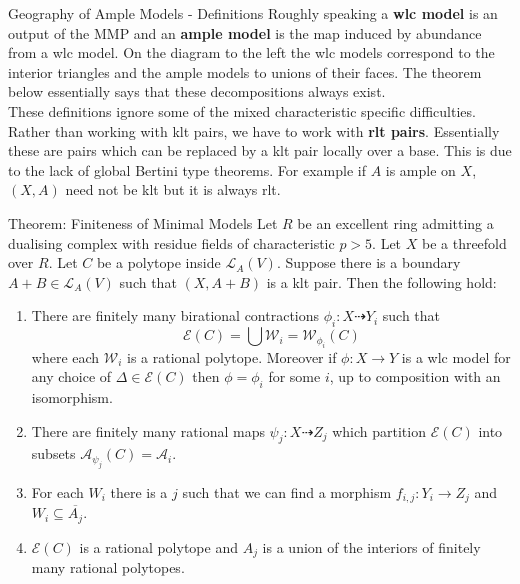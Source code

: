 \documentclass[final]{beamer}
\begin{document}
\begin{frame}[t, fragile]
\begin{columns}[t]
\begin{column}{0.44\paperwidth}
\begin{block}{Geography of Ample Models - Definitions}
				Roughly speaking a \textbf{wlc model} is an output of the MMP and an \textbf{ample model} is the map induced by abundance from a wlc model. On the diagram to the left the wlc models correspond to the interior triangles and the ample models to unions of their faces. The theorem below essentially says that these decompositions always exist.\\
				\hfill \break
				These definitions ignore some of the mixed characteristic specific difficulties. Rather than working with klt pairs, we have to work with \textbf{rlt pairs}. Essentially these are pairs which can be replaced by a klt pair locally over a base. This is due to the lack of global Bertini type theorems. For example if $A$ is ample on $X$, $(X,A)$ need not be klt but it is always rlt.
				
			\end{block}
			
			\begin{alertblock}{Theorem: Finiteness of Minimal Models \cite{stigant2021}}
				Let $R$ be an excellent ring admitting a dualising complex with residue fields of characteristic $p > 5$.
				Let $X$ be a threefold over $R$. Let $C$ be a polytope inside $\mathcal{L}_{A}(V)$. Suppose there is a boundary $A+B \in \mathcal{L}_{A}(V)$ such that $(X,A+B)$ is a klt pair. Then the following hold:
				
				\begin{enumerate}
					\item There are finitely many birational contractions $\phi_{i}:X \dashrightarrow Y_{i}$ such that 
					\[\mathcal{E}(C) = \bigcup \mathcal{W}_{i}=\mathcal{W}_{\phi_{i}}(C)\]
					where each $\mathcal{W}_{i}$ is a rational polytope. Moreover if $\phi:X \to Y$ is a wlc model for any choice of $\Delta \in \mathcal{E}(C)$ then $\phi=\phi_{i}$ for some $i$, up to composition with an isomorphism.
					
					\item There are finitely many rational maps $\psi_{j}:X \dashrightarrow Z_{j}$ which partition $\mathcal{E}(C)$ into subsets $\mathcal{A}_{\psi_{j}}(C)=\mathcal{A}_{i}$.
					\item  For each $W_{i}$ there is a $j$ such that we can find a morphism $f_{i,j}: Y_{i} \to Z_{j}$ and $W_{i} \subseteq \overline{A_{j}}$.
					\item  $\mathcal{E}(C)$ is a rational polytope and $A_{j}$ is a union of the interiors of finitely many rational polytopes.
				\end{enumerate}
			\end{alertblock}
			

\end{column}
\end{columns}
\end{frame}
\end{document}
